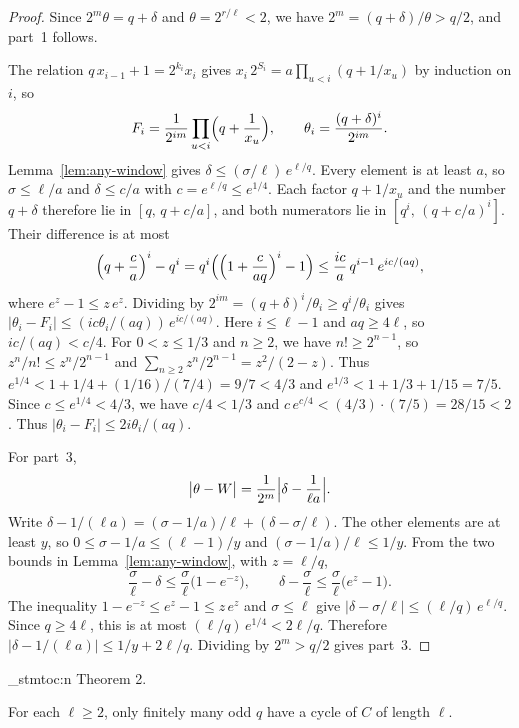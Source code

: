 \documentclass[11pt]{article}
\newenvironment{named}[1]{%
  \par\addvspace{\medskipamount}%
  \pagebreak[3]%
  \noindent{\bfseries #1}\space\ignorespaces
  \stmtoc{#1}%
}{\par\addvspace{\medskipamount}}
\newcommand{\stmtoc}[1]{ \qn_stmtoc:n {#1} }
\begin{document}
\begin{proof}
Since $2^m \theta = q + \delta$ and $\theta = 2^{r/\ell} < 2$, we have $2^m = (q+\delta)/\theta > q/2$, and part~1 follows.

The relation $q\, x_{i-1} + 1 = 2^{k_i} x_i$ gives $x_i\, 2^{S_i} = a \prod_{u < i}(q + 1/x_u)$ by induction on $i$, so
\[
F_i = \frac{1}{2^{im}}\prod_{u < i}\Bigl(q + \frac{1}{x_u}\Bigr), \qquad \theta_i = \frac{(q+\delta)^i}{2^{im}}.
\]
Lemma~\ref{lem:any-window} gives $\delta \le (\sigma/\ell)\, e^{\ell/q}$.
Every element is at least $a$, so $\sigma \le \ell/a$ and $\delta \le c/a$ with $c = e^{\ell/q} \le e^{1/4}$.
Each factor $q + 1/x_u$ and the number $q+\delta$ therefore lie in $[q,\, q + c/a]$, and both numerators lie in $[q^i,\, (q + c/a)^i]$.
Their difference is at most
\[
\Bigl(q + \frac{c}{a}\Bigr)^i - q^i = q^i\Bigl(\Bigl(1 + \frac{c}{aq}\Bigr)^i - 1\Bigr) \le \frac{ic}{a}\, q^{i-1}\, e^{ic/(aq)},
\]
where $e^z - 1 \le z\, e^z$.
Dividing by $2^{im} = (q+\delta)^i/\theta_i \ge q^i/\theta_i$ gives $\lvert \theta_i - F_i \rvert \le (ic\theta_i/(aq))\, e^{ic/(aq)}$.
Here $i \le \ell - 1$ and $aq \ge 4\ell$, so $ic/(aq) < c/4$.
For $0 < z \le 1/3$ and $n \ge 2$, we have $n! \ge 2^{n-1}$, so $z^n/n! \le z^n/2^{n-1}$ and $\sum_{n \ge 2} z^n/2^{n-1} = z^2/(2-z)$.
Thus $e^{1/4} < 1 + 1/4 + (1/16)/(7/4) = 9/7 < 4/3$ and $e^{1/3} < 1 + 1/3 + 1/15 = 7/5$.
Since $c \le e^{1/4} < 4/3$, we have $c/4 < 1/3$ and $c\, e^{c/4} < (4/3) \cdot (7/5) = 28/15 < 2$.
Thus $\lvert \theta_i - F_i \rvert \le 2i\theta_i/(aq)$.

For part~3,
\[
\bigl\lvert \theta - W \bigr\rvert = \frac{1}{2^m}\Bigl\lvert \delta - \frac{1}{\ell a} \Bigr\rvert.
\]
Write $\delta - 1/(\ell a) = (\sigma - 1/a)/\ell + (\delta - \sigma/\ell)$.
The other elements are at least $y$, so $0 \le \sigma - 1/a \le (\ell-1)/y$ and $(\sigma - 1/a)/\ell \le 1/y$.
From the two bounds in Lemma~\ref{lem:any-window}, with $z = \ell/q$,
\[
\frac{\sigma}{\ell} - \delta \le \frac{\sigma}{\ell}\bigl(1 - e^{-z}\bigr), \qquad \delta - \frac{\sigma}{\ell} \le \frac{\sigma}{\ell}\bigl(e^z - 1\bigr).
\]
The inequality $1 - e^{-z} \le e^z - 1 \le z\, e^z$ and $\sigma \le \ell$ give $\lvert \delta - \sigma/\ell \rvert \le (\ell/q)\, e^{\ell/q}$.
Since $q \ge 4\ell$, this is at most $(\ell/q)\, e^{1/4} < 2\ell/q$.
Therefore $\lvert \delta - 1/(\ell a) \rvert \le 1/y + 2\ell/q$.
Dividing by $2^m > q/2$ gives part~3.
\end{proof}

\begin{named}{Theorem 2.}
For each $\ell \ge 2$, only finitely many odd $q$ have a cycle of $C$ of length $\ell$.
\end{named}
\end{document}
